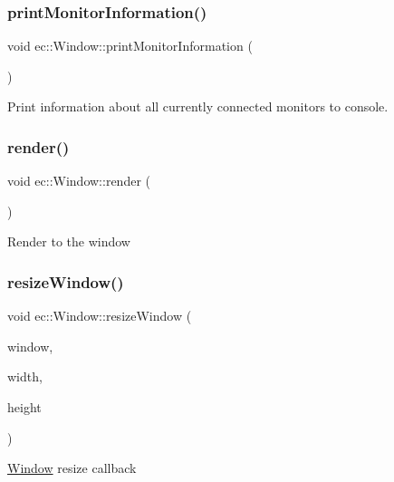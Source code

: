 \subsubsection{\texorpdfstring{print\+Monitor\+Information()}{printMonitorInformation()}}
{\footnotesize\ttfamily void ec\+::\+Window\+::print\+Monitor\+Information (\begin{DoxyParamCaption}{ }\end{DoxyParamCaption})\hspace{0.3cm}{\ttfamily [static]}}

Print information about all currently connected monitors to console. \mbox{\label{classec_1_1_window_acb066b817adc7c790b0810695078dee3}} 
\subsubsection{\texorpdfstring{render()}{render()}}
{\footnotesize\ttfamily void ec\+::\+Window\+::render (\begin{DoxyParamCaption}{ }\end{DoxyParamCaption})\hspace{0.3cm}{\ttfamily [virtual]}}

Render to the window \mbox{\label{classec_1_1_window_a33ef071f4198715ae42844c681fb40eb}} 
\subsubsection{\texorpdfstring{resize\+Window()}{resizeWindow()}}
{\footnotesize\ttfamily void ec\+::\+Window\+::resize\+Window (\begin{DoxyParamCaption}\item[{G\+L\+F\+Wwindow $\ast$}]{window,  }\item[{int}]{width,  }\item[{int}]{height }\end{DoxyParamCaption})\hspace{0.3cm}{\ttfamily [virtual]}}

\mbox{\hyperlink{classec_1_1_window}{Window}} resize callback \mbox{\label{classec_1_1_window_a30b3a1e8d3b0f8ae82ee9e4e0235f174}} 
